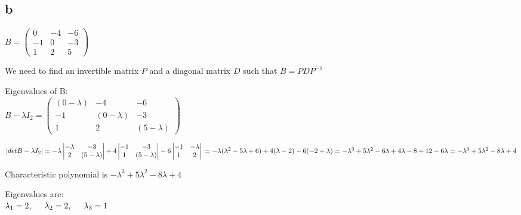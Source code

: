 \documentclass{article}
\begin{document}
\subsection*{b}

$B =
\left (
	\begin{matrix}
		0 & -4 & -6\\
		-1 & 0 & -3\\
		1 & 2 & 5
	\end{matrix}
\right )
$

We need to find an invertible matrix $P$ and a diagonal matrix $D$ such that $B = PDP^{-1}$

Eigenvalues of B:\\
$B-\lambda I_{2} =
\left (
	\begin{matrix}
		(0-\lambda) & -4 & -6\\
		-1 & (0-\lambda) & -3\\
		1 & 2 & (5-\lambda)
	\end{matrix}
\right )
$

$|det B-\lambda I_{2}| =
-\lambda
\left |
    \begin{matrix}
        -\lambda & -3\\
        2 & (5-\lambda)
    \end{matrix}
\right |
+4
\left |
    \begin{matrix}
        -1 & -3\\
        1 & (5-\lambda)
    \end{matrix}
\right |
-6
\left |
    \begin{matrix}
        -1 & -\lambda\\
        1 & 2
    \end{matrix}
\right | \\
=
-\lambda(\lambda^{2}-5\lambda+6) +
4(\lambda - 2) -
6(-2 + \lambda) \\
=
-\lambda^{3} + 5\lambda^{2} - 6\lambda
+ 4\lambda - 8
+ 12 - 6\lambda \\
= -\lambda^{3} + 5\lambda^{2} -8\lambda + 4
$

Characteristic polynomial is 
$-\lambda^{3} + 5\lambda^{2} -8\lambda + 4$

Eigenvalues are:\\
$
\lambda_{1} = 2, \hspace{5 mm}
\lambda_{2} = 2, \hspace{5 mm}
\lambda_{3} = 1
$
\end{document}
